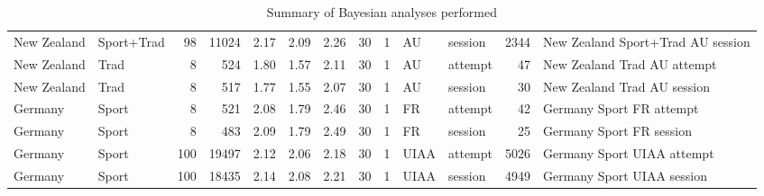 \begin{table}[ht]
\begin{tabular}{llrrrrrrrllrl}
  New Zealand & Sport+Trad &  98 & 11024 & 2.17 & 2.09 & 2.26 &  30 &   1 & AU & session & 2344 & New Zealand Sport+Trad AU session \\ 
  New Zealand & Trad &   8 & 524 & 1.80 & 1.57 & 2.11 &  30 &   1 & AU & attempt &  47 & New Zealand Trad AU attempt \\ 
  New Zealand & Trad &   8 & 517 & 1.77 & 1.55 & 2.07 &  30 &   1 & AU & session &  30 & New Zealand Trad AU session \\ 
  Germany & Sport &   8 & 521 & 2.08 & 1.79 & 2.46 &  30 &   1 & FR & attempt &  42 & Germany Sport FR attempt \\ 
  Germany & Sport &   8 & 483 & 2.09 & 1.79 & 2.49 &  30 &   1 & FR & session &  25 & Germany Sport FR session \\ 
  Germany & Sport & 100 & 19497 & 2.12 & 2.06 & 2.18 &  30 &   1 & UIAA & attempt & 5026 & Germany Sport UIAA attempt \\ 
  Germany & Sport & 100 & 18435 & 2.14 & 2.08 & 2.21 &  30 &   1 & UIAA & session & 4949 & Germany Sport UIAA session \\ 
   \hline
\end{tabular}
\endgroup
\caption{Summary of Bayesian analyses performed} 
\end{table}
